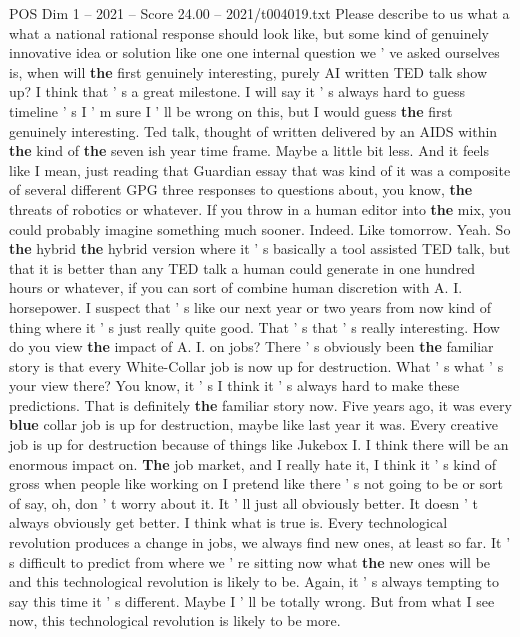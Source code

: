 \begin{textsample}{POS Dim 1 – 2021 – Score 24.00 – 2021/t004019.txt}
Please describe to us what a what a national rational response should look like, but some kind of genuinely innovative idea or solution like one one internal question we ' ve asked ourselves is, when will \textbf{the} first genuinely interesting, purely AI written TED talk show up?
I think that ' s a great milestone.
I will say it ' s always hard to guess timeline ' s I ' m sure I ' ll be wrong on this, but I would guess \textbf{the} first genuinely interesting.
Ted talk, thought of written delivered by an AIDS within \textbf{the} kind of \textbf{the} seven ish year time frame.
Maybe a little bit less.
And it feels like I mean, just reading that Guardian essay that was kind of it was a composite of several different GPG three responses to questions about, you know, \textbf{the} threats of robotics or whatever.
If you throw in a human editor into \textbf{the} mix, you could probably imagine something much sooner.
Indeed.
Like tomorrow.
Yeah.
So \textbf{the} hybrid \textbf{the} hybrid version where it ' s basically a tool assisted TED talk, but that it is better than any TED talk a human could generate in one hundred hours or whatever, if you can sort of combine human discretion with A.
I. horsepower.
I suspect that ' s like our next year or two years from now kind of thing where it ' s just really quite good.
That ' s that ' s really interesting.
How do you view \textbf{the} impact of A.
I. on jobs?
There ' s obviously been \textbf{the} familiar story is that every White-Collar job is now up for destruction.
What ' s what ' s your view there?
You know, it ' s I think it ' s always hard to make these predictions.
That is definitely \textbf{the} familiar story now.
Five years ago, it was every \textbf{blue} collar job is up for destruction, maybe like last year it was.
Every creative job is up for destruction because of things like Jukebox I.
I think there will be an enormous impact on. \textbf{The} job market, and I really hate it, I think it ' s kind of gross when people like working on I pretend like there ' s not going to be or sort of say, oh, don ' t worry about it.
It ' ll just all obviously better.
It doesn ' t always obviously get better.
I think what is true is.
Every technological revolution produces a change in jobs, we always find new ones, at least so far.
It ' s difficult to predict from where we ' re sitting now what \textbf{the} new ones will be and this technological revolution is likely to be.
Again, it ' s always tempting to say this time it ' s different.
Maybe I ' ll be totally wrong.
But from what I see now, this technological revolution is likely to be more.

\end{textsample}
